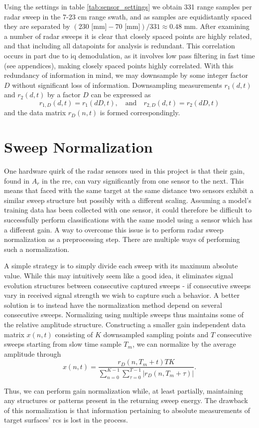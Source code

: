 Using the settings in table \ref{tab:sensor_settings} we obtain 331 range samples per radar sweep in the 7-23 cm range swath, and as samples are equidistantly spaced they are separated by $(230 \text{ [mm]}-70\text{ [mm]})/331\approx0.48$ mm. After examining a number of radar sweeps it is clear that closely spaced points are highly related, and that including all datapoints for analysis is redundant. This correlation occurs in part due to \gls{iq} demodulation, as it involves low pass filtering in fast time (see appendices), making closely spaced points highly correlated. With this redundancy of information in mind, we may downsample by some integer factor $D$ without significant loss of information. Downsampling measurements $r_1(d,t)$ and $r_2(d,t)$ by a factor $D$ can be expressed as
\begin{equation}
	\label{eq:downsamp}
	r_{1,D}(d, t) = r_{1}(dD,t),
	\quad \text{and} \quad r_{2,D}(d,t) = r_{2}(dD,t)
\end{equation}
and the data matrix $r_D(n,t)$ is formed correspondingly.

\section{Sweep Normalization}\label{sec:norm}

One hardware quirk of the radar sensors used in this project is that their gain, found in $A_r$ in the \gls{rre}, can vary significantly from one sensor to the next. This means that faced with the same target at the same distance two sensors exhibit a similar sweep structure but possibly with a different scaling. Assuming a model's training data has been collected with one sensor, it could therefore be difficult to successfully perform classifications with the same model using a sensor which has a different gain. A way to overcome this issue is to perform radar sweep normalization as a preprocessing step. There are multiple ways of performing such a normalization. %

A simple strategy is to simply divide each sweep with its maximum absolute value. While this may intuitively seem like a good idea, it eliminates signal evolution structures between consecutive captured sweeps - if consecutive sweeps vary in received signal strength we wish to capture such a behavior. A better solution is to instead have the normalization method depend on several consecutive sweeps. Normalizing using multiple sweeps thus maintains some of the relative amplitude structure. Constructing a smaller gain independent data matrix $x(n,t)$ consisting of $K$ downsampled sampling points and $T$ consecutive sweeps starting from slow time sample $T_m$, we can normalize by the average amplitude through
\begin{equation}
	x(n,t) = 
	\frac{r_D(n, T_m + t)TK}{\sum_{n=0}^{K-1}\sum_{\tau=0}^{T-1}|r_D(n, T_m+\tau)|}.
\end{equation}

Thus, we can perform gain normalization while, at least partially, maintaining any structures or patterns present in the returning sweep energy. The drawback of this normalization is that information pertaining to absolute measurements of target surfaces' \gls{rcs} is lost in the process.

